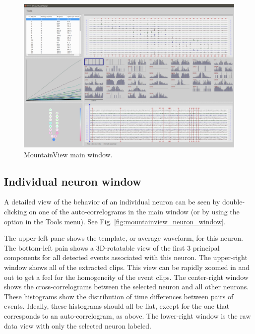 \documentclass[hidelinks,10pt]{article}
\begin{document}
\begin{figure}[!h]
\centering
\includegraphics[width=6in]{images/mountainview_main_window.png}
\caption{
MountainView main window.
}
\label{fig:mountainview_main_window}
\end{figure}

\subsection {Individual neuron window}

A detailed view of the behavior of an individual neuron can be seen by double-clicking on one of the auto-correlograms in the main window (or by using the option in the Tools menu). See Fig. \ref{fig:mountainview_neuron_window}.

The upper-left pane shows the template, or average waveform, for this neuron. The bottom-left pain shows a 3D-rotatable view of the first 3 principal components for all detected events associated with this neuron. The upper-right window shows all of the extracted clips. This view can be rapidly zoomed in and out to get a feel for the homogeneity of the event clips. The center-right window shows the cross-correlograms between the selected neuron and all other neurons. These histograms show the distribution of time differences between pairs of events. Ideally, these histograms should all be flat, except for the one that corresponds to an auto-correlogram, as above. The lower-right window is the raw data view with only the selected neuron labeled.
\end{document}
